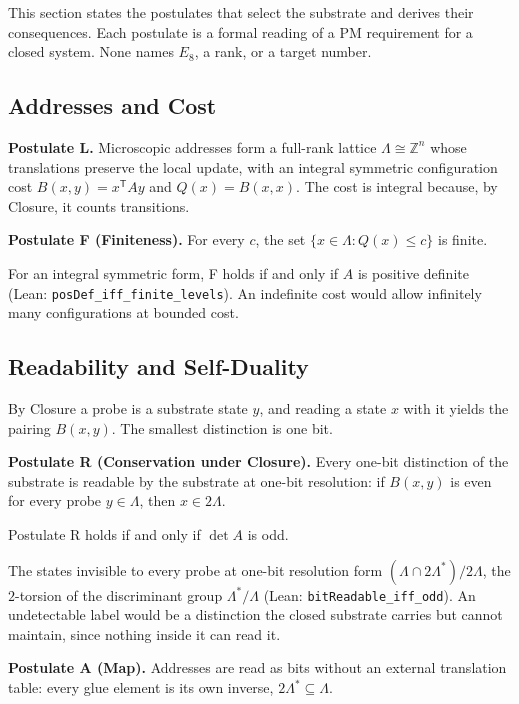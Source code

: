This section states the postulates that select the substrate and derives their consequences. Each postulate is a formal reading of a PM requirement for a closed system. None names $E_8$, a rank, or a target number.

\subsection{Addresses and Cost}
\label{sec:finiteness}
\textbf{Postulate L.} Microscopic addresses form a full-rank lattice $\Lambda\cong\mathbb Z^n$ whose translations preserve the local update, with an integral symmetric configuration cost $B(x,y)=x^{\mathsf T}Ay$ and $Q(x)=B(x,x)$. The cost is integral because, by Closure, it counts transitions.

\textbf{Postulate F (Finiteness).} For every $c$, the set $\{x\in\Lambda: Q(x)\le c\}$ is finite.

For an integral symmetric form, F holds if and only if $A$ is positive definite (Lean: \texttt{posDef\_iff\_finite\_levels}). An indefinite cost would allow infinitely many configurations at bounded cost.

\subsection{Readability and Self-Duality}
\label{sec:readability}
By Closure a probe is a substrate state $y$, and reading a state $x$ with it yields the pairing $B(x,y)$. The smallest distinction is one bit.

\textbf{Postulate R (Conservation under Closure).} Every one-bit distinction of the substrate is readable by the substrate at one-bit resolution: if $B(x,y)$ is even for every probe $y\in\Lambda$, then $x\in2\Lambda$.

\begin{theorem}
Postulate R holds if and only if $\det A$ is odd.
\end{theorem}
The states invisible to every probe at one-bit resolution form $(\Lambda\cap2\Lambda^*)/2\Lambda$, the $2$-torsion of the discriminant group $\Lambda^*/\Lambda$ (Lean: \texttt{bitReadable\_iff\_odd}). An undetectable label would be a distinction the closed substrate carries but cannot maintain, since nothing inside it can read it.

\textbf{Postulate A (Map).} Addresses are read as bits without an external translation table: every glue element is its own inverse, $2\Lambda^*\subseteq\Lambda$.

